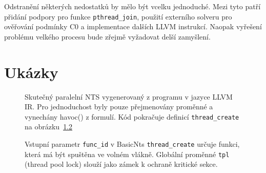 \documentclass[12pt]{fithesis2}
\begin{document}
Odstranění některých nedostatků by mělo být vcelku jednoduché. Mezi tyto patří přidání podpory pro funkce \texttt{pthread\_join}, použití externího solveru pro ověřování podmínky C0 a implementace dalších LLVM instrukcí. Naopak vyřešení problému velkého procesu bude zřejmě vyžadovat delší zamyšlení.


\printbibliography

\appendix
\chapter{Ukázky}

\begin{figure}[h!]

\caption{Skutečný paralelní NTS vygenerovaný z programu v jazyce LLVM IR. Pro jednoduchost byly pouze přejmenovány proměnné a vynechány havoc() z formulí. Kód pokračuje definicí \texttt{thread\_create} na obrázku~\ref{fig:appendix:real-parallel-nts:2}} 
\label{fig:appendix:real-parallel-nts}
\end{figure}

\begin{figure}

\caption{Vstupní parametr \texttt{func\_id} v BasicNts \texttt{thread\_create} určuje funkci, která má být spuštěna ve volném vlákně. Globální proměnné \texttt{tpl} (thread pool lock) slouží jako zámek k ochraně kritické sekce.}
\label{fig:appendix:real-parallel-nts:2}
\end{figure}
\end{document}
